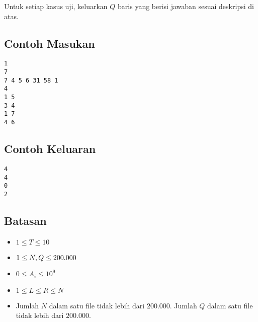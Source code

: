 \documentclass{article}
\begin{document}
\par Untuk setiap kasus uji, keluarkan $Q$ baris yang berisi jawaban sesuai deskripsi di atas. 

\subsection*{Contoh Masukan}

\begin{lstlisting}
1
7
7 4 5 6 31 58 1
4
1 5
3 4
1 7
4 6
\end{lstlisting}

\subsection*{Contoh Keluaran}

\begin{lstlisting}
4
4
0
2

\end{lstlisting}

\subsection*{Batasan}

\begin{itemize}
  \item $1 \leq T\leq 10$
  \item $1 \leq N,\space Q\leq 200.000$
  \item $0 \leq A_{i} \leq 10^9$
  \item $1 \leq L \leq R \leq N$
  \item Jumlah $N$ dalam satu file tidak lebih dari $200.000$. Jumlah $Q$ dalam satu file tidak lebih dari $200.000$.
\end{itemize}
\end{document}
